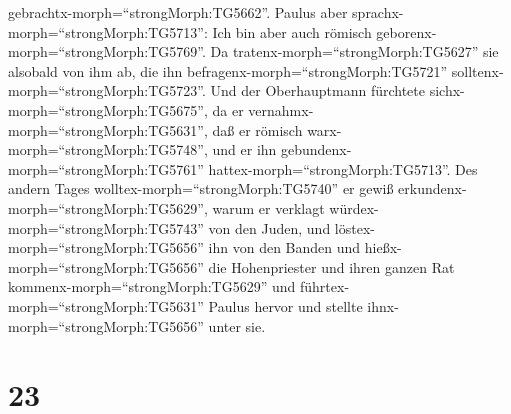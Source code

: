 gebrachtx-morph=``strongMorph:TG5662''. Paulus aber
sprachx-morph=``strongMorph:TG5713'': Ich bin aber auch römisch
geborenx-morph=``strongMorph:TG5769''.  Da
tratenx-morph=``strongMorph:TG5627'' sie alsobald von ihm ab, die ihn
befragenx-morph=``strongMorph:TG5721''
solltenx-morph=``strongMorph:TG5723''. Und der Oberhauptmann fürchtete
sichx-morph=``strongMorph:TG5675'', da er
vernahmx-morph=``strongMorph:TG5631'', daß er römisch
warx-morph=``strongMorph:TG5748'', und er ihn
gebundenx-morph=``strongMorph:TG5761''
hattex-morph=``strongMorph:TG5713''.  Des andern Tages
wolltex-morph=``strongMorph:TG5740'' er gewiß
erkundenx-morph=``strongMorph:TG5629'', warum er verklagt
würdex-morph=``strongMorph:TG5743'' von den Juden, und
löstex-morph=``strongMorph:TG5656'' ihn von den Banden und
hießx-morph=``strongMorph:TG5656'' die Hohenpriester und ihren ganzen
Rat kommenx-morph=``strongMorph:TG5629'' und
führtex-morph=``strongMorph:TG5631'' Paulus hervor und stellte
ihnx-morph=``strongMorph:TG5656'' unter sie.

\hypertarget{section-22}{%
\section{23}\label{section-22}}

